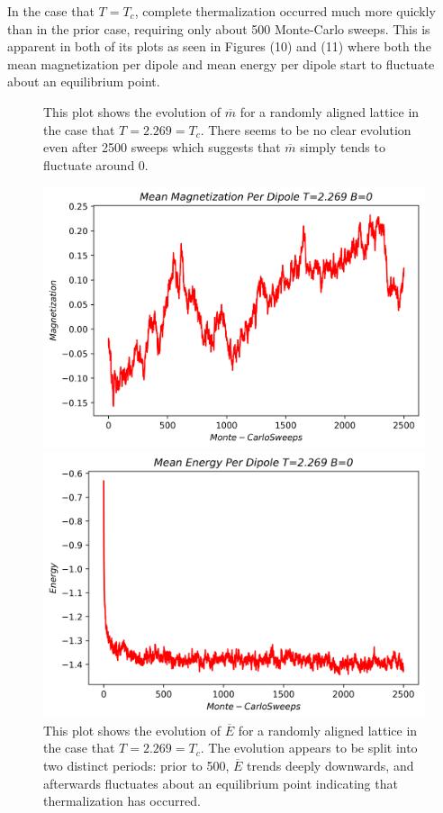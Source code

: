 \documentclass[twocolumn]{article}
\begin{document}
In the case that $T = T_c$, complete thermalization occurred much more quickly than in the prior case, requiring only about 500 Monte-Carlo sweeps. This is apparent in both of its plots as seen in Figures (10) and (11) where both the mean magnetization per dipole and mean energy per dipole start to fluctuate about an equilibrium point.
\begin{figure}[H]
\caption{This plot shows the evolution of $\overline{m}$ for a randomly aligned lattice in the case that $T=2.269=T_c$. There seems to be no clear evolution even after 2500 sweeps which suggests that $\overline{m}$ simply tends to fluctuate around 0.}
\centering
\includegraphics[scale=.5]{MagnetizationT=2269B=0}
\caption{This plot shows the evolution of $\overline{E}$ for a randomly aligned lattice in the case that $T=2.269=T_c$. The evolution appears to be split into two distinct periods: prior to 500, $\overline{E}$ trends deeply downwards, and afterwards fluctuates about an equilibrium point indicating that thermalization has occurred.}
\centering
\includegraphics[scale=.5]{EnergyT=2269B=0}
\end{figure}
\end{document}
